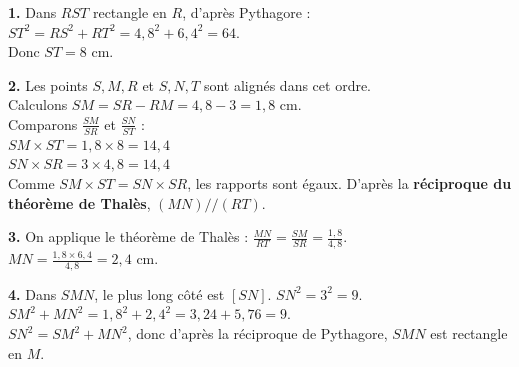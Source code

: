 \documentclass[a4paper]{book}
\begin{document}
\begin{exercice}
    \begin{minipage}{0.65\textwidth}
        \textbf{1.} Dans $RST$ rectangle en $R$, d'après Pythagore : \\
        $ST^2 = RS^2 + RT^2 = 4,8^2 + 6,4^2 = 64$. \\
        Donc $ST = 8$ cm.
        
        \vspace{0.3cm}
        \textbf{2.} Les points $S, M, R$ et $S, N, T$ sont alignés dans cet ordre. \\
        Calculons $SM = SR - RM = 4,8 - 3 = 1,8$ cm.\\
        Comparons $\frac{SM}{SR}$ et $\frac{SN}{ST}$ :\\
        $SM \times ST = 1,8 \times 8 = 14,4$ \\
        $SN \times SR = 3 \times 4,8 = 14,4$ \\
        Comme $SM \times ST = SN \times SR$, les rapports sont égaux. D'après la \textbf{réciproque du théorème de Thalès}, $(MN) // (RT)$.
        
        \vspace{0.3cm}
        \textbf{3.} On applique le théorème de Thalès : $\frac{MN}{RT} = \frac{SM}{SR} = \frac{1,8}{4,8}$.\\
        $MN = \frac{1,8 \times 6,4}{4,8} = 2,4$ cm.
        
        \vspace{0.3cm}
        \textbf{4.} Dans $SMN$, le plus long côté est $[SN]$. $SN^2 = 3^2 = 9$.\\
        $SM^2 + MN^2 = 1,8^2 + 2,4^2 = 3,24 + 5,76 = 9$.\\
        $SN^2 = SM^2 + MN^2$, donc d'après la réciproque de Pythagore, $SMN$ est rectangle en $M$.
    \end{minipage}
    \hfill
    \begin{minipage}{0.3\textwidth}
        \begin{center}
        \end{center}
    \end{minipage}
\end{exercice}
\end{document}
